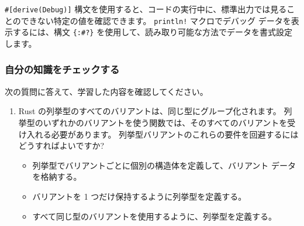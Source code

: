 \texttt{\#[derive(Debug)]} 構文を使用すると、コードの実行中に、標準出力では見ることのできない特定の値を確認できます。 \texttt{println!} マクロでデバッグ データを表示するには、構文 \texttt{\{:\#?\}} を使用して、読み取り可能な方法でデータを書式設定します。

\subsubsection{自分の知識をチェックする}


次の質問に答えて、学習した内容を確認してください。


\begin{enumerate}
\item Rust の列挙型のすべてのバリアントは、同じ型にグループ化されます。 列挙型のいずれかのバリアントを使う関数では、そのすべてのバリアントを受け入れる必要があります。 列挙型バリアントのこれらの要件を回避するにはどうすればよいですか?

\begin{itemize}
\item 列挙型でバリアントごとに個別の構造体を定義して、バリアント データを格納する。

\item バリアントを 1 つだけ保持するように列挙型を定義する。

\item すべて同じ型のバリアントを使用するように、列挙型を定義する。
\end{itemize}

\end{enumerate}
